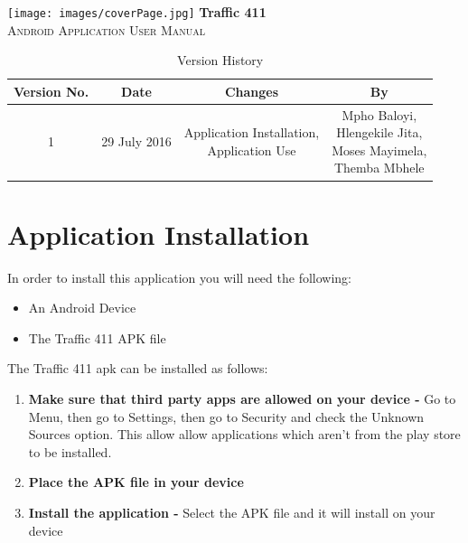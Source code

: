 \documentclass[a4paper,12pt]{article}
\begin{document}
\newpage
\tableofcontents
\newpage
\texttt{[image: images/coverPage.jpg]}
\textbf{Traffic 411}\\
\textsc{\large Android Application User Manual}\\[0.5cm]
\newpage
\tableofcontents
\newpage

\newpage
\begin{table}[ht]
 \centering
 \caption{Version History}
 \label{tab:table1}
 \begin{tabular}{cccc}
   \toprule
    Version No. & Date & Changes & By\\
    \midrule
    1 & 29 July 2016 & \makecell{Application Installation, \\ Application Use} & \makecell{Mpho Baloyi,\\ Hlengekile Jita,\\ Moses Mayimela,\\ Themba Mbhele} \\
    \bottomrule
  \end{tabular}
\end{table}
\newpage

\section{Application Installation}
In order to install this application you will need the following:
\begin{itemize}
\item An Android Device
\item The Traffic 411 APK file
\end{itemize}

The Traffic 411 apk can be installed as follows:
\begin{enumerate}
\item \textbf{Make sure that third party apps are allowed on your device -} Go to Menu, then go to Settings, then go to Security and check the Unknown Sources option. This allow allow applications which aren't from the play store to be installed.
\item \textbf{Place the APK file in your device} 
\item \textbf{Install the application -} Select the APK file and it will install on your device
\end{enumerate}
\end{document}
